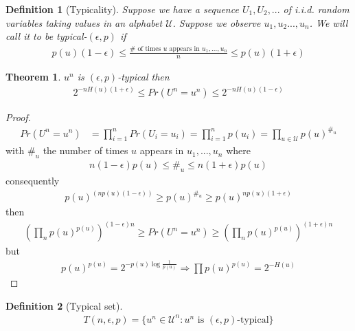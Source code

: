 \documentclass[twoside]{article}
\newtheorem{theorem}{Theorem}[section]
\newtheorem{definition}{Definition}[section]
\theoremstyle{definition} %
\def\U{\mathcal{U}}
\begin{document}
\begin{definition}[Typicality]
  \label{def:typicality}
Suppose we have a sequence $U_1, U_2, ...$ of i.i.d. random variables taking values in an alphabet $\U$.
Suppose we observe $u_1,u_2..., u_n$. We will call it to be \textit{typical-$(\epsilon, p)$} if
\begin{align*}
  p(u) (1 - \epsilon)
  \leq \frac{\# \text{ of times $u$ appears in $u_1, ..., u_n$}}{n}
  \leq p(u)(1+\epsilon)
\end{align*}
\end{definition}

\begin{theorem}
  $u^n$ is $(\epsilon, p)$-typical then
  \begin{align*}
    2^{-n H(u)(1 + \epsilon)}
    \leq Pr(U^n = u^n)
    \leq 2^{-n H(u)(1 - \epsilon)}
  \end{align*}
\end{theorem}

\begin{proof}
  \begin{align*}
    Pr(U^n = u^n) &= \prod_{i=1}^n Pr(U_i = u_i) = \prod_{i=1}^n p(u_i) = \prod_{u \in \U} p(u)^{\#_u}
  \end{align*}
  with $\#_u$ the number of times $u$ appears in $u_1, ..., u_n$ where
  \begin{align*}
    n (1-\epsilon) p(u) \leq \#_u \leq n(1+\epsilon)p(u)
  \end{align*}
  consequently
  \begin{align*}
    p(u)^{(n p(u)(1-\epsilon))} \geq p(u)^{\#_u} \geq p(u)^{n p(u)(1+\epsilon)}
  \end{align*}
  then
  \begin{align*}
    (\prod_{n} p(u)^{p(u)})^{(1-\epsilon)n}
    \geq Pr(U^n = u^n)
    \geq (\prod_{n} p(u)^{p(u)})^{(1+\epsilon)n}
  \end{align*}
  but
  \begin{align*}
    p(u)^{p(u)} = 2^{-p(u) \log \frac{1}{p(u)}} \Rightarrow \prod p(u)^{p(u)} = 2^{-H(u)}
  \end{align*}
\end{proof}

\begin{definition}[Typical set]
  \begin{align*}
    T(n, \epsilon, p) = \{ u^n \in \U^n : u^n \text{ is } (\epsilon, p)\text{-typical}\}
  \end{align*}
\end{definition}
\end{document}
